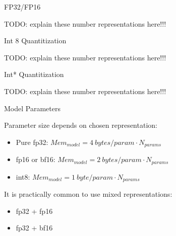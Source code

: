 
\begin{vbframe}{FP32/FP16}

TODO: explain these number representations here!!!
    
\end{vbframe}


\begin{vbframe}{Int 8 Quantitization}

TODO: explain these number representations here!!!
    
\end{vbframe}


\begin{vbframe}{Int* Quantitization}

TODO: explain these number representations here!!!
    
\end{vbframe}


\begin{vbframe}{Model Parameters}

\vfill

Parameter size depends on chosen representation: \newline

\begin{itemize}
 	\item Pure fp32: $Mem_{model} = 4 ~bytes/param \cdot N_{params}$
 	\item fp16 or bf16: $Mem_{model} = 2 ~bytes/param \cdot N_{params}$
	\item int8: $Mem_{model} = 1 ~byte/param \cdot N_{params}$
\end{itemize}

\vskip8mm

It is practically common to use mixed representations: \newline

\begin{itemize}
 	\item fp32 + fp16
	\item fp32 + bf16
\end{itemize}

\vfill

\end{vbframe}

